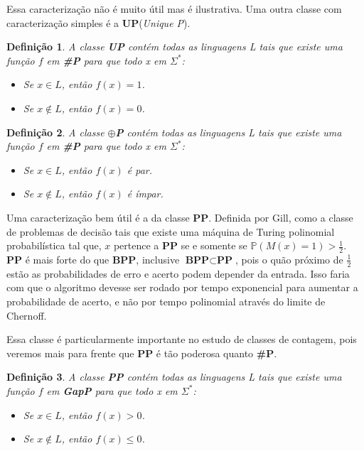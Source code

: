 \documentclass[paper=a4, fontsize=11pt]{scrartcl} %
\newtheorem{definition}{Definição}
\numberwithin{equation}{subsection}
\numberwithin{figure}{subsection}
\numberwithin{table}{subsection}
\numberwithin{definition}{subsection}
\numberwithin{theorem}{subsection}
\numberwithin{property}{subsection}
\numberwithin{proposition}{subsection}
\newcommand{\words}{$\Sigma^*$\xspace}
\newcommand{\UP}{\textbf{UP}\xspace}
\newcommand{\BPP}{\textbf{BPP}\xspace}
\newcommand{\parP}{\textbf{$\oplus$P}\xspace}
\newcommand{\SP}{\textbf{\#P}\xspace}
\newcommand{\PP}{\textbf{PP}\xspace}
\newcommand{\gP}{\textbf{GapP}\xspace}
\begin{document}
Essa caracterização não é muito útil mas é ilustrativa. Uma outra classe com caracterização simples é a \UP (\textit{Unique P}).

\begin{definition}
A classe \UP contém todas as linguagens L tais que existe uma função $f$ em \SP para que todo x em \words:
\begin{itemize}
  \item Se $x \in L$, então $f(x) = 1$.
  \item Se $x \notin L$, então $f(x) = 0$.
\end{itemize}
\end{definition}

\begin{definition}
A classe \parP contém todas as linguagens L tais que existe uma função $f$ em \SP para que todo x em \words:
\begin{itemize}
  \item Se $x \in L$, então $f(x)$ é par.
  \item Se $x \notin L$, então $f(x)$ é ímpar.
\end{itemize}
\end{definition}

Uma caracterização bem útil é a da classe \PP. Definida por Gill, como a classe de problemas de decisão tais que existe uma máquina de Turing polinomial probabilística tal que, $x$ pertence a \PP se e somente se $\mathbb{P}(M(x) = 1) > \frac{1}{2}$. \PP é mais forte do que \BPP, inclusive $\BPP \subset \PP$, pois o quão próximo de $\frac{1}{2}$ estão as probabilidades de erro e acerto podem depender da entrada. Isso faria com que o algoritmo devesse ser rodado por tempo exponencial para aumentar a probabilidade de acerto, e não por tempo polinomial através do limite de Chernoff.

Essa classe é particularmente importante no estudo de classes de contagem, pois veremos mais para frente que \PP é tão poderosa quanto \SP.

\begin{definition}
A classe \PP contém todas as linguagens L tais que existe uma função $f$ em \gP para que todo x em \words:
\begin{itemize}
  \item Se $x \in L$, então $f(x) > 0$.
  \item Se $x \notin L$, então $f(x) \leq 0$.
\end{itemize}
\end{definition}
  
\end{document}
